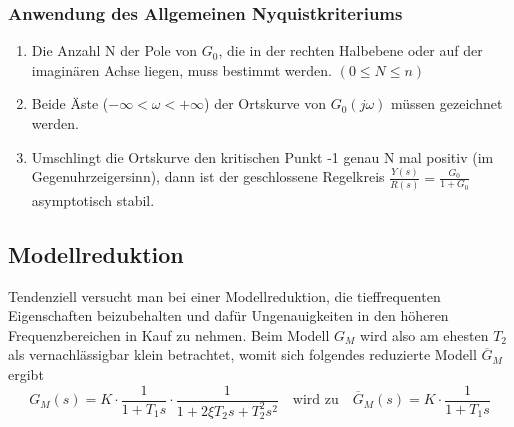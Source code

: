 \subsubsection{Anwendung des Allgemeinen Nyquistkriteriums }
\begin{enumerate}
\item Die Anzahl N der Pole von $G_0$, die in der rechten Halbebene oder auf der
imaginären Achse liegen, muss bestimmt werden. $(0 \leq N \leq n)$
\item Beide Äste ($-\infty < \omega < +\infty$) der Ortskurve von $G_0(j\omega)$ müssen gezeichnet werden.
\item Umschlingt die Ortskurve den kritischen Punkt -1 genau N mal positiv (im
Gegenuhrzeigersinn), dann ist der geschlossene Regelkreis 
$\frac{Y(s)}{R(s)} = \frac{G_0}{1+G_0}$ asymptotisch stabil.
\end{enumerate}

\subsection{Modellreduktion }

Tendenziell versucht man bei einer Modellreduktion, die tieffrequenten Eigenschaften
beizubehalten und dafür Ungenauigkeiten in den höheren Frequenzbereichen in
Kauf zu nehmen. Beim Modell $G_M$ wird also am ehesten $T_2$ als vernachlässigbar
klein betrachtet, womit sich folgendes reduzierte Modell $\overline{G}_M$ ergibt
\[G_M(s)=K\cdot\frac{1}{1+T_1s}\cdot\frac{1}{1+2\xi T_2 s +T^2_2 s^2} \quad \text{wird zu} \quad \overline{G}_M(s)=K\cdot\frac{1}{1+T_1s}\]